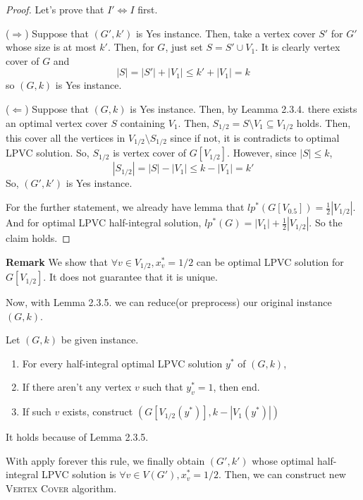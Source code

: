 \documentclass[12pt, a4paper, openany, twoside]{book}
\theoremstyle{definition}
\theoremstyle{remark}
\theoremstyle{plain}
\numberwithin{equation}{section}
\begin{document}
\begin{proof}
    
Let's prove that $I' \iff I$ first. 

($\Rightarrow$) 
Suppose that $(G', k')$ is Yes instance. Then, take a vertex cover $S'$ for $G'$ whose size is at most $k'$. Then, for $G$, just set $S = S' \cup V_1$. 
It is clearly vertex cover of $G$ and \[|S| = |S'| + |V_1| \leq k' + |V_1| = k\] so $(G, k)$ is Yes instance. 

($\Leftarrow$)
Suppose that $(G, k)$ is Yes instance. Then, by Leamma 2.3.4. there exists an optimal vertex cover $S$ containing $V_1$. 
Then, $S_{1/2} = S \setminus V_1 \subseteq V_{1/2}$ holds. Then, this cover all the vertices in $V_{1/2} \setminus S_{1/2}$ since 
if not, it is contradicts to optimal LPVC solution. So, $S_{1/2}$ is vertex cover of $G[V_{1/2}]$. However, since $|S| \leq k$, \[|S_{1/2}| = |S| - |V_1| \leq k - |V_1| = k'\]
So, $(G', k')$ is Yes instance. 

For the further statement, we already have lemma that $lp^*(G[V_{0.5}]) = \frac{1}{2}|V_{1/2}|$. 
And for optimal LPVC half-integral solution, $lp^*(G) = |V_1| + \frac{1}{2}|V_{1/2}|$. So the claim holds. 
\end{proof}

\textbf{Remark} We show that $\forall v \in V_{1/2}, x^*_v = 1/2$ can be optimal LPVC solution for $G[V_{1/2}]$. It does not guarantee that 
it is unique. 

\vspace{4mm}

Now, with Lemma 2.3.5. we can reduce(or preprocess) our original instance $(G, k)$. 

\begin{tcolorbox}[colback=yellow!10!white,colframe=blue!75!black,title=Reduction Rule of LPVC]

Let $(G, k)$ be given instance. 
\begin{enumerate}
    \item For every half-integral optimal LPVC solution $y^*$ of $(G, k)$,  
    \item If there aren't any vertex $v$ such that $y^*_v = 1$, then end. 
    \item If such $v$ exists, construct $(G[V_{1/2}(y^*)], k - |V_1(y^*)|)$
\end{enumerate}
It holds because of Lemma 2.3.5.
\end{tcolorbox}

With apply forever this rule, we finally obtain $(G', k')$ whose optimal half-integral LPVC solution is 
$\forall v \in V(G'), x^*_v = 1/2$. Then, we can construct new \textsc{Vertex Cover} algorithm. 
\end{document}
